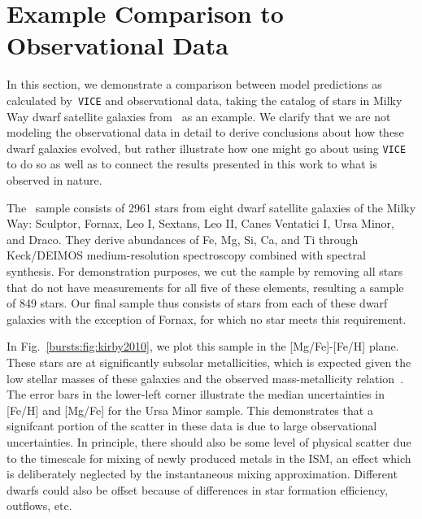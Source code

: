 \documentclass[main.tex]{subfiles}
\begin{document}
\chapter{Example Comparison to Observational Data}
\label{bursts:appendix:obs_compare}
In this section, we demonstrate a comparison between model predictions as 
calculated by~\texttt{VICE} and observational data, taking the catalog of 
stars in Milky Way dwarf satellite galaxies from~\citet{Kirby2010} as an 
example. We clarify that we are not modeling the observational data in detail 
to derive conclusions about how these dwarf galaxies evolved, but rather 
illustrate how one might go about using \texttt{VICE} to do so as well as to 
connect the results presented in this work to what is observed in nature. 
\par 
The~\citet{Kirby2010} sample consists of 2961 stars from eight dwarf satellite 
galaxies of the Milky Way: Sculptor, Fornax, Leo I, Sextans, Leo II, Canes 
Ventatici I, Ursa Minor, and Draco. They derive abundances of Fe, Mg, Si, Ca, 
and Ti through Keck/DEIMOS medium-resolution spectroscopy combined with 
spectral synthesis. For demonstration purposes, we cut the sample by removing 
all stars that do not have measurements for all five of these elements, 
resulting a sample of 849 stars. Our final sample thus consists of stars from 
each of these dwarf galaxies with the exception of Fornax, for which no star 
meets this requirement. 
\par 
In Fig.~\ref{bursts:fig:kirby2010}, we plot this sample in the [Mg/Fe]-[Fe/H] plane. 
These stars are at significantly subsolar metallicities, which is expected 
given the low stellar masses of these galaxies and the observed 
mass-metallicity relation~\citep[e.g.][]{Andrews2013}. The error bars in the 
lower-left corner illustrate the median uncertainties in [Fe/H] and [Mg/Fe] 
for the Ursa Minor sample. This demonstrates that a signifcant portion of the 
scatter in these data is due to large observational uncertainties. In 
principle, there should also be
some level of physical scatter 
due to the timescale for mixing of newly produced metals in the ISM, an 
effect which is deliberately neglected by the instantaneous mixing 
approximation. 
Different dwarfs could also be offset because of differences in 
star formation efficiency, outflows, etc.
\end{document}
